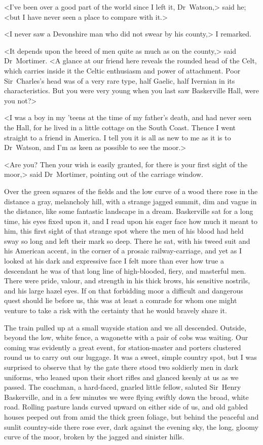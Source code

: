 <I've been over a good part of the world since I left it, Dr~Watson,> said he; <but I have never seen a place to compare with it.>

<I never saw a Devonshire man who did not swear by his county,> I remarked.

<It depends upon the breed of men quite as much as on the county,> said Dr~Mortimer. <A glance at our friend here reveals the rounded head of the Celt, which carries inside it the Celtic enthusiasm and power of attachment. Poor Sir~Charles's head was of a very rare type, half Gaelic, half Ivernian in its characteristics. But you were very young when you last saw Baskerville Hall, were you not?>

<I was a boy in my 'teens at the time of my father's death, and had never seen the Hall, for he lived in a little cottage on the South Coast. Thence I went straight to a friend in America. I tell you it is all as new to me as it is to Dr~Watson, and I'm as keen as possible to see the moor.>

<Are you? Then your wish is easily granted, for there is your first sight of the moor,> said Dr~Mortimer, pointing out of the carriage window.

Over the green squares of the fields and the low curve of a wood there rose in the distance a gray, melancholy hill, with a strange jagged summit, dim and vague in the distance, like some fantastic landscape in a dream. Baskerville sat for a long time, his eyes fixed upon it, and I read upon his eager face how much it meant to him, this first sight of that strange spot where the men of his blood had held sway so long and left their mark so deep. There he sat, with his tweed suit and his American accent, in the corner of a prosaic railway-carriage, and yet as I looked at his dark and expressive face I felt more than ever how true a descendant he was of that long line of high-blooded, fiery, and masterful men. There were pride, valour, and strength in his thick brows, his sensitive nostrils, and his large hazel eyes. If on that forbidding moor a difficult and dangerous quest should lie before us, this was at least a comrade for whom one might venture to take a risk with the certainty that he would bravely share it.

The train pulled up at a small wayside station and we all descended. Outside, beyond the low, white fence, a wagonette with a pair of cobs was waiting. Our coming was evidently a great event, for station-master and porters clustered round us to carry out our luggage. It was a sweet, simple country spot, but I was surprised to observe that by the gate there stood two soldierly men in dark uniforms, who leaned upon their short rifles and glanced keenly at us as we passed. The coachman, a hard-faced, gnarled little fellow, saluted Sir~Henry Baskerville, and in a few minutes we were flying swiftly down the broad, white road. Rolling pasture lands curved upward on either side of us, and old gabled houses peeped out from amid the thick green foliage, but behind the peaceful and sunlit country-side there rose ever, dark against the evening sky, the long, gloomy curve of the moor, broken by the jagged and sinister hills.

